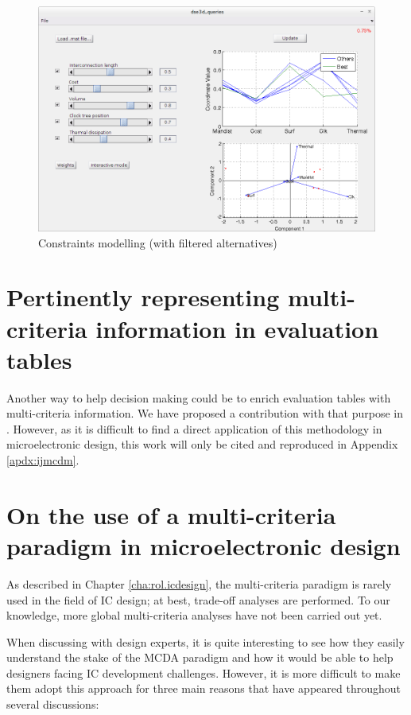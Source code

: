 \begin{figure}[h!]
\begin{center}
\includegraphics[width=\linewidth]{dseconstraints2}
\end{center}
\caption{Constraints modelling (with filtered alternatives)}
\label{fig:dse2}
\end{figure}

\section{Pertinently representing multi-criteria information in evaluation tables}
Another way to help decision making could be to enrich evaluation tables with multi-criteria information. We have proposed a contribution with that purpose in \cite{LidDoaDes2014:techreport}. However, as it is difficult to find a direct application of this methodology in microelectronic design, this work will only be cited and reproduced in Appendix \ref{apdx:ijmcdm}.

\section{On the use of a multi-criteria paradigm in microelectronic design}
As described in Chapter \ref{cha:rol.icdesign}, the multi-criteria paradigm is rarely used in the field of IC design; at best, trade-off analyses are performed. To our knowledge, more global multi-criteria analyses have not been carried out yet.

When discussing with design experts, it is quite interesting to see how they easily understand the stake of the MCDA paradigm and how it would be able to help designers facing IC development challenges. However, it is more difficult to make them adopt this approach for three main reasons that have appeared throughout several discussions:


